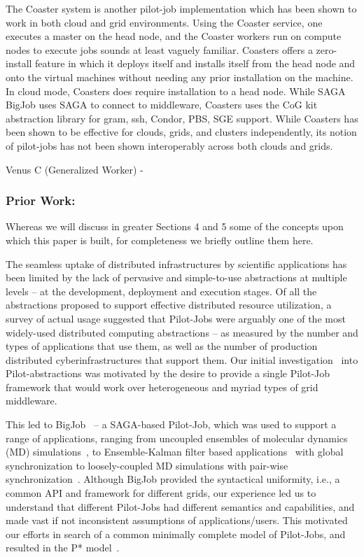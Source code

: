 \documentclass[times]{cpeauth}
\newcommand{\alnote}[1]{ {\textcolor{green} { ***andreL: #1 }}}
\newcommand{\alnote}[1]{}
\newcommand{\pilot}{Pilot\xspace}
\newcommand{\pilotjob}{Pilot-Job\xspace}
\newcommand{\pilotjobs}{Pilot-Jobs\xspace}
\newcommand{\pstar}{P*\xspace}
\begin{document}
The Coaster system is another pilot-job implementation which has been shown to work in both cloud and grid environments. Using the Coaster service, one executes a master on the head node, and the Coaster workers run on compute nodes to execute jobs sounds at least vaguely familiar. Coasters offers a zero-install feature in which it deploys itself and installs itself from the head node and onto the virtual machines without needing any prior installation on the machine. In cloud mode, Coasters does require installation to a head node. While SAGA BigJob uses SAGA to connect to middleware, Coasters uses the CoG kit abstraction library for gram, ssh, Condor, PBS, SGE support. While Coasters has been shown to be effective for clouds, grids, and clusters independently, its notion of pilot-jobs has not been shown interoperably across both clouds and grids.
 
Venus C (Generalized Worker) - 

\subsubsection*{Prior Work:}

Whereas we will discuss in greater Sections 4 and 5 some of the
concepts upon which this paper is built, for completeness we briefly
outline them here.

 The seamless uptake of distributed
infrastructures by scientific applications has been limited by the
lack of pervasive and simple-to-use abstractions at multiple levels –
at the development, deployment and execution stages. Of all the
abstractions proposed to support effective distributed resource
utilization, a survey of actual usage suggested that \pilotjobs were
arguably one of the most widely-used distributed computing
abstractions – as measured by the number and types of applications
that use them, as well as the number of production distributed
cyberinfrastructures that support them.  Our initial
investigation~\cite{Luckow:2008la} into \pilot-abstractions
was motivated by the desire to provide a single \pilotjob framework
that would work over heterogeneous and myriad types of grid middleware.

This led to BigJob~\cite{saga_bigjob_condor_cloud} -- a SAGA-based
\pilotjob, which was used to support a range of applications, ranging
from uncoupled ensembles of molecular dynamics (MD)
simulations~\cite{saga_bigjob_condor_cloud}, to Ensemble-Kalman filter
based applications~\cite{gmac09} with global synchronization to
loosely-coupled MD simulations with pair-wise
synchronization~\cite{async_repex11}.  Although BigJob provided the
syntactical uniformity, i.e., a common API and framework for different
grids, our experience led us to understand that different \pilotjobs
had different semantics and capabilities, and made vast if not
inconsistent assumptions of applications/users. This motivated our
efforts in search of a common minimally complete model of \pilotjobs,
and resulted in the \pstar model~\cite{pstar12}.
\end{document}
